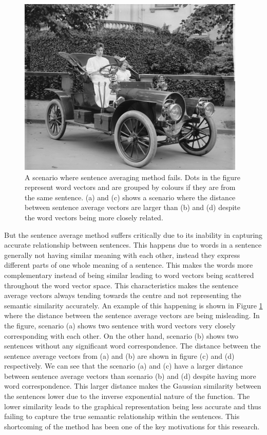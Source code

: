 \documentclass[acmlarge]{acmart}
\begin{document}
\begin{figure}
	\centering
	\includegraphics{sample-franklin}
	\caption{A scenario where sentence averaging method fails. Dots in the figure represent word vectors and are grouped by colours if they are from the same sentence. (a) and (c) shows a scenario where the distance between sentence average vectors are larger than (b) and (d) despite the word vectors being more closely related.}
	\label{fig:sarkar-problem}
\end{figure}

But the sentence average method suffers critically due to its inability in capturing accurate relationship between sentences. This happens due to words in a sentence generally not having similar meaning with each other, instead they express different parts of one whole meaning of a sentence. This makes the words more complementary instead of being similar leading to word vectors being scattered throughout the word vector space. This characteristics makes the sentence average vectors always tending towards the centre and not representing the semantic similarity accurately. An example of this happening is shown in Figure \ref{fig:sarkar-problem} where the distance between the sentence average vectors are being misleading. In the figure, scenario (a) shows two sentence with word vectors very closely corresponding with each other. On the other hand, scenario (b) shows two sentences without any significant word correspondence. The distance between the sentence average vectors  from (a) and (b) are shown in figure (c) and (d) respectively. We can see that the scenario (a) and (c) have a larger distance between sentence average vectors than scenario (b) and (d) despite having more word correspondence. This larger distance makes the Gaussian similarity between the sentences lower due to the inverse exponential nature of the function. The lower similarity leads to the graphical representation being less accurate and thus failing to capture the true semantic relationship within the sentences. This shortcoming of the method has been one of the key motivations for this research.
\end{document}
